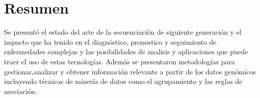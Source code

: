 \section*{Resumen}

Se presentó el estado del arte de la secuenciación de siguiente generación y el impacto que ha tenido en el diagnóstico, pronostico y seguimiento de enfermedades complejas y las posibilidades de analisis y aplicaciones que puede traer el uso de estas tecnologías. Además se presentaron metodologías para gestionar,analizar y obtener información relevante a partir de los datos genómicos incluyendo técnicas de minería de datos como el agrupamiento y las reglas de asociación. 
